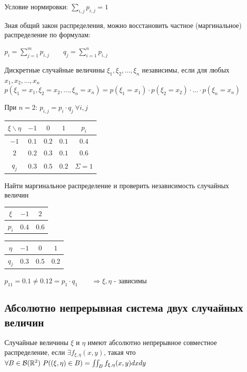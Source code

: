 \documentclass[12pt]{article}
\begin{document}
    Условие нормировки: $\sum_{i, j} p_{i, j} = 1$

    Зная общий закон распределения, можно восстановить частное (маргинальное) распределение по формулам: 

    $p_i = \sum_{j = 1}^m p_{i, j} \qquad q_j = \sum_{i = 1}^n p_{i, j}$

    \Def Дискретные случайные величины $\xi_1, \xi_2, \dots, \xi_n$ независимы, если для любых $x_1, x_2, \dots, x_n$ 
    $p(\xi_1 = x_1, \xi_2 = x_2, \dots, \xi_n = x_n) = p(\xi_1 = x_1) \cdot p(\xi_2 = x_2) \cdot \dots \cdot p(\xi_n = x_n)$

    При $n = 2$: $p_{i, j} = p_i \cdot q_j \ \forall i, j$

    \Ex

    \begin{tabular}{c|c|c|c|c}
        $\xi \backslash \eta$ & $-1$ & $0$ & $1$ & $p_i$ \\
        \hline
        $-1$ & $0.1$ & $0.2$ & $0.1$ & $0.4$ \\
        \hline
        $2$ & $0.2$ & $0.3$ & $0.1$ & $0.6$ \\
        \hline
        $q_j$ & $0.3$ & $0.5$ & $0.2$ & $\Sigma = 1$ \\
    \end{tabular}

    Найти маргинальное распределение и проверить независимость случайных величин


    \begin{tabular}{c|c|c}
        $\xi$ & $-1$ & $2$ \\
        \hline
        $p_i$ & $0.4$ & $0.6$  \\
    \end{tabular}

    \begin{tabular}{c|c|c|c}
        $\eta$ & $-1$ & $0$ & $1$ \\
        \hline
        $q_j$ & $0.3$ & $0.5$ & $0.2$  \\
    \end{tabular}

    $p_{11} = 0.1 \neq 0.12 = p_1 \cdot q_1 \qquad \Longrightarrow \xi, \eta$ - зависимы

    \subsection{Абсолютно непрерывная система двух случайных величин}

    \Def Случайные величины $\xi$ и $\eta$ имеют абсолютно непрерывное совместное распределение, если
    $\exists f_{\xi, \eta}(x, y)$, такая что $\forall B \in \mathcal{B}(\mathbb{R}^2) \ P((\xi, \eta) \in B) = \iint_B f_{\xi, \eta}(x, y) dxdy$
\end{document}

